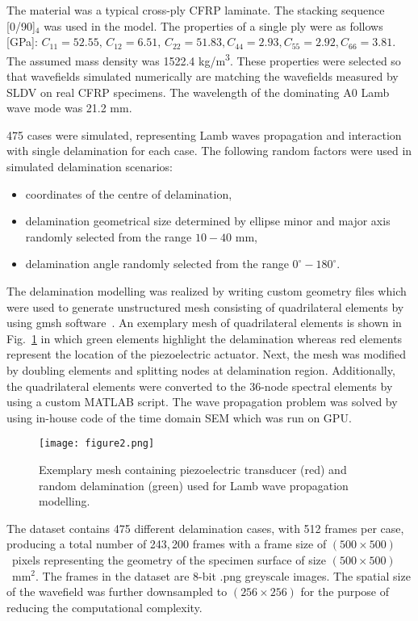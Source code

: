 \documentclass[sn-mathphys-num]{sn-jnl}%
\begin{document}
	The material was a typical cross-ply CFRP laminate. 
	The stacking sequence [0/90]\(_4\) was used in the model. 
	The properties of a single ply were as follows [GPa]:
	\(C_{11} = 52.55, \, C_{12} = 6.51, \, C_{22} = 51.83, C_{44} = 2.93, 
	C_{55} = 
	2.92, C_{66} = 3.81\). 
	The assumed mass density was 1522.4 kg/m\textsuperscript{3}.
	These properties were selected so that wavefields simulated numerically are 
	matching the wavefields measured by SLDV on real CFRP specimens.
	The wavelength of the dominating A0 Lamb wave mode was 21.2 mm.
	
	475 cases were simulated, representing Lamb waves propagation and 
	interaction 
	with single delamination for each case. 
	The following random factors were used in simulated delamination scenarios:
	\begin{itemize}
		\item coordinates of the centre of delamination,
		\item delamination geometrical size	determined by ellipse minor and 
		major axis randomly selected from the range $10-40$ mm,
		\item delamination angle randomly selected from the range $ 
		0^{\circ}-180^{\circ}$.
		
	\end{itemize}
	The delamination modelling was realized by writing custom geometry files 
	which were used to generate unstructured mesh consisting of quadrilateral 
	elements by using gmsh software~\cite{Geuzaine2009}.
	An exemplary mesh of quadrilateral elements is shown in 
	Fig.~\ref{fig:random_delam_mesh} in which green elements highlight the 
	delamination whereas red elements represent the location of the 
	piezoelectric actuator.
	Next, the mesh was modified by doubling elements and splitting nodes at 
	delamination region.
	Additionally, the quadrilateral elements were converted to the 36-node 
	spectral elements by using a custom MATLAB script.
	The wave propagation problem was solved by using in-house code of the time 
	domain SEM which was run on GPU.
	\begin{figure} [h!]
		\begin{center}
			\texttt{[image: figure2.png]}
		\end{center}
		\caption{Exemplary mesh containing piezoelectric transducer (red) and 
		random delamination (green) used for Lamb wave propagation modelling.} 
		\label{fig:random_delam_mesh}
	\end{figure}
	The dataset contains 475 different delamination cases, with 512 frames per 
	case, producing a total number of 243,\,200 frames with a frame size of 
	\((500\times500)\)~pixels representing the geometry of the specimen surface 
	of size \((500\times500)\)~mm\(^{2}\).
	The frames in the dataset are 8-bit .png greyscale images.
	The spatial size of the wavefield was further downsampled to 
	\((256\times256)\) for the purpose of 
	reducing the computational complexity.
	
\end{document}
